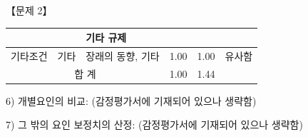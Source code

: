 \begin{longquestion}{【문제 2】}
\begin{framedtext}
{{\begin{tabular}{|p{1.3cm}|p{2.7cm}|p{4.3cm}|c|c|p{2.3cm}|}
 & & 기타 규제 & & & \\\hline
기타조건 & 기타 & 장래의 동향, 기타 & 1.00 & 1.00 & 유사함 \\\hline
\multicolumn{3}{|c|}{합 계} & 1.00 & 1.44 & \\\hline
\end{tabular}}\par}
6) 개별요인의 비교: (감정평가서에 기재되어 있으나 생략함) \par
7) 그 밖의 요인 보정치의 산정: (감정평가서에 기재되어 있으나 생략함) \par
\end{framedtext}
\end{longquestion}
